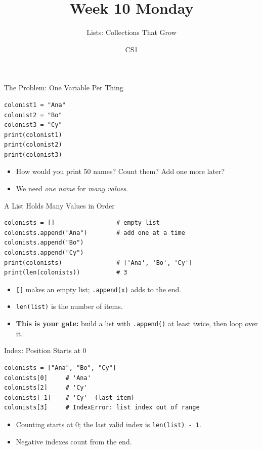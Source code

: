 \documentclass{beamer}
\title{Week 10 Monday}
\subtitle{Lists: Collections That Grow}
\author{CS1}
\date{}
\begin{document}

\begin{frame}[fragile]{The Problem: One Variable Per Thing}
\begin{verbatim}
colonist1 = "Ana"
colonist2 = "Bo"
colonist3 = "Cy"
print(colonist1)
print(colonist2)
print(colonist3)
\end{verbatim}
\begin{itemize}
    \item How would you print 50 names? Count them? Add one more later?
    \item We need \emph{one name} for \emph{many values}.
\end{itemize}
\end{frame}

\begin{frame}[fragile]{A List Holds Many Values in Order}
\begin{verbatim}
colonists = []                 # empty list
colonists.append("Ana")        # add one at a time
colonists.append("Bo")
colonists.append("Cy")
print(colonists)               # ['Ana', 'Bo', 'Cy']
print(len(colonists))          # 3
\end{verbatim}
\begin{itemize}
    \item \texttt{[]} makes an empty list; \texttt{.append(x)} adds to the end.
    \item \texttt{len(list)} is the number of items.
    \item \textbf{This is your gate:} build a list with \texttt{.append()} at least twice, then loop over it.
\end{itemize}
\end{frame}

\begin{frame}[fragile]{Index: Position Starts at 0}
\begin{verbatim}
colonists = ["Ana", "Bo", "Cy"]
colonists[0]     # 'Ana'
colonists[2]     # 'Cy'
colonists[-1]    # 'Cy'  (last item)
colonists[3]     # IndexError: list index out of range
\end{verbatim}
\begin{itemize}
    \item Counting starts at 0; the last valid index is \texttt{len(list) - 1}.
    \item Negative indexes count from the end.
\end{itemize}
\end{frame}
\end{document}
